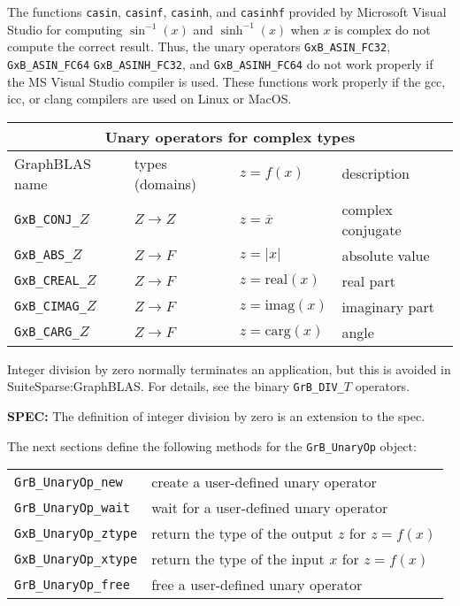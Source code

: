 \documentclass[12pt]{article}
\begin{document}
{The functions \verb'casin', \verb'casinf', \verb'casinh', and \verb'casinhf'
provided by Microsoft Visual Studio for computing $\sin^{-1}(x)$ and
$\sinh^{-1}(x)$ when $x$ is complex do not compute the correct result.  Thus,
the unary operators \verb'GxB_ASIN_FC32', \verb'GxB_ASIN_FC64'
\verb'GxB_ASINH_FC32', and \verb'GxB_ASINH_FC64' do not work properly if the MS
Visual Studio compiler is used.  These functions work properly if the gcc, icc,
or clang compilers are used on Linux or MacOS.

\vspace{0.2in}
\begin{tabular}{|llll|}
\hline
\multicolumn{4}{|c|}{Unary operators for complex types} \\
\hline
GraphBLAS name          & types (domains)   & $z=f(x)$      & description \\
\hline
\verb'GxB_CONJ_'$Z$    & $Z \rightarrow Z$ & $z = \overline{x}$     & complex conjugate \\
\verb'GxB_ABS_'$Z$     & $Z \rightarrow F$ & $z = |x|$              & absolute value \\
\verb'GxB_CREAL_'$Z$   & $Z \rightarrow F$ & $z = \mbox{real}(x)$   & real part \\
\verb'GxB_CIMAG_'$Z$   & $Z \rightarrow F$ & $z = \mbox{imag}(x)$   & imaginary part \\
\verb'GxB_CARG_'$Z$    & $Z \rightarrow F$ & $z = \mbox{carg}(x)$   & angle \\
\hline
\end{tabular}
}
\vspace{0.2in}

Integer division by zero normally terminates an application, but this is
avoided in SuiteSparse:GraphBLAS.  For details, see the binary
\verb'GrB_DIV_'$T$ operators.

\begin{spec}
{\bf SPEC:} The definition of integer division by zero is an extension to the spec.
\end{spec}

The next sections define the following methods for the \verb'GrB_UnaryOp'
object:

\vspace{0.1in}
{\footnotesize
\begin{tabular}{ll}
\hline
\verb'GrB_UnaryOp_new'   & create a user-defined unary operator  \\
\verb'GrB_UnaryOp_wait'  & wait for a user-defined unary operator \\
\verb'GxB_UnaryOp_ztype' & return the type of the output $z$ for $z=f(x)$\\
\verb'GxB_UnaryOp_xtype' & return the type of the input $x$ for $z=f(x)$\\
\verb'GrB_UnaryOp_free'  & free a user-defined unary operator  \\
\hline
\end{tabular}
}
\vspace{0.1in}
\end{document}
